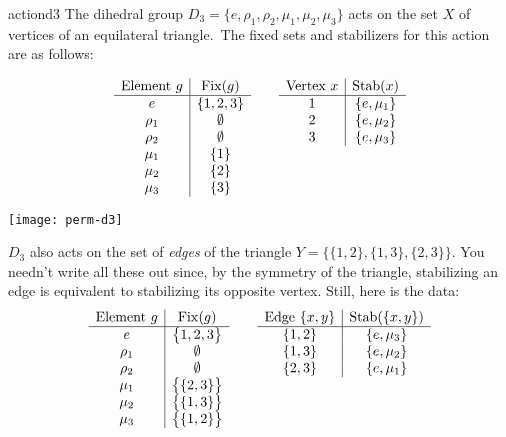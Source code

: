\begin{example}{}{actiond3}
The dihedral group $D_3=\{e,\rho_1,\rho_2,\mu_1,\mu_2,\mu_3\}$ acts on the set $X$ of vertices of an equilateral triangle.\footnotemark\ The fixed sets and stabilizers for this action are as follows:\par
\begin{minipage}[t]{0.74\linewidth}\vspace{-10pt}
\[\begin{array}[t]{c|c}
\text{Element $g$}&\operatorname{Fix}(g)\\\hline
e&\{1,2,3\}\\
\rho_1&\emptyset\\
\rho_2&\emptyset\\
\mu_1&\{1\}\\
\mu_2&\{2\}\\
\mu_3&\{3\}
\end{array}
\qquad
\begin{array}[t]{c|c}
\text{Vertex $x$}&\operatorname{Stab}(x)\\\hline
1&\{e,\mu_1\}\\
2&\{e,\mu_2\}\\
3&\{e,\mu_3\}
\end{array}\]
\end{minipage}\hfill\begin{minipage}[t]{0.25\linewidth}\vspace{-20pt}
\flushright\texttt{[image: perm-d3]}
\end{minipage}\smallbreak
$D_3$ also acts on the set of \emph{edges} of the triangle $Y=\bigl\{\{1,2\},\{1,3\},\{2,3\}\bigr\}$. You needn't write all these out since, by the symmetry of the triangle, stabilizing an edge is equivalent to stabilizing its opposite vertex. Still, here is the data:
\[\begin{array}[t]{c|c}
\text{Element $g$}&\operatorname{Fix}(g)\\\hline
e&\bigl\{1,2,3\bigr\}\\
\rho_1&\emptyset\\
\rho_2&\emptyset\\
\mu_1&\bigl\{\{2,3\}\bigr\}\\
\mu_2&\bigl\{\{1,3\}\bigr\}\\
\mu_3&\bigl\{\{1,2\}\bigr\}
\end{array}
\qquad
\begin{array}[t]{c|c}
\text{Edge $\{x,y\}$}&\operatorname{Stab}(\{x,y\})\\\hline
\{1,2\}&\{e,\mu_3\}\\
\{1,3\}&\{e,\mu_2\}\\
\{2,3\}&\{e,\mu_1\}
\end{array}\]
\end{example}

